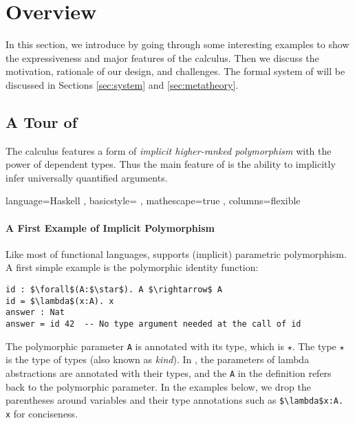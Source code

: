 \section{Overview}

In this section, we introduce \name by going through
some interesting examples to show the expressiveness and major features of the calculus.
Then we discuss the motivation, rationale of our design, and challenges.
The formal system of \name will be
discussed in Sections \ref{sec:system} and \ref{sec:metatheory}.

\subsection{A Tour of \name}
\label{sec:examples}

The \name calculus features a form of \emph{implicit
  higher-ranked polymorphism} with the power of dependent types. Thus the main feature of \name
is the ability to implicitly infer universally quantified arguments.

\lstset
  { language=Haskell
  , basicstyle=\ttfamily
  , mathescape=true
  , columns=flexible}

\paragraph{A First Example of Implicit Polymorphism}
Like most of functional languages, \name supports (implicit) parametric polymorphism.
A first simple example is the polymorphic identity function:
\begin{lstlisting}
id : $\forall$(A:$\star$). A $\rightarrow$ A
id = $\lambda$(x:A). x
answer : Nat
answer = id 42  -- No type argument needed at the call of id
\end{lstlisting}
\noindent The polymorphic parameter \lstinline{A} is annotated with its type,
which is $\star$. The type $\star$ is the type of types (also known as
\emph{kind}). In \name, the parameters of lambda abstractions are annotated
with their types, and the \lstinline{A} in the definition refers back to the
polymorphic parameter. In the examples below, we drop the parentheses around
variables and their type annotations such as \lstinline{$\lambda$x:A. x} for conciseness.

